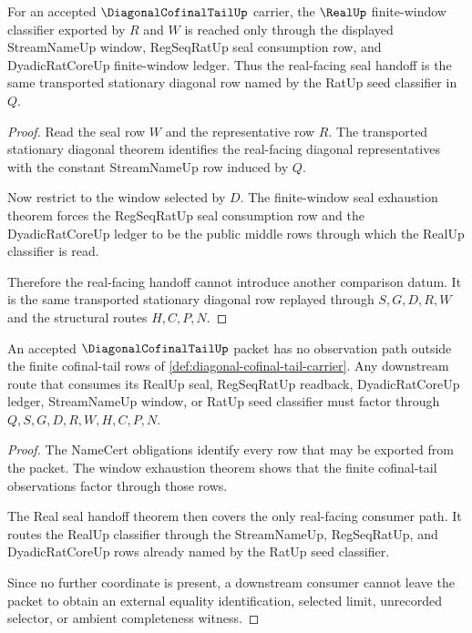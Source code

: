 \begin{theorem}
\label{thm:diagonal-cofinal-tail-real-seal-handoff}
For an accepted $\DiagonalCofinalTailUp$ carrier, the $\RealUp$ finite-window classifier exported by $R$ and $W$ is reached only through the displayed StreamNameUp window, RegSeqRatUp seal consumption row, and DyadicRatCoreUp finite-window ledger. Thus the real-facing seal handoff is the same transported stationary diagonal row named by the RatUp seed classifier in $Q$.
\end{theorem}
\begin{proof}
Read the seal row $W$ and the representative row $R$. The transported stationary diagonal theorem identifies the real-facing diagonal representatives with the constant StreamNameUp row induced by $Q$.

Now restrict to the window selected by $D$. The finite-window seal exhaustion theorem forces the RegSeqRatUp seal consumption row and the DyadicRatCoreUp ledger to be the public middle rows through which the RealUp classifier is read.

Therefore the real-facing handoff cannot introduce another comparison datum. It is the same transported stationary diagonal row replayed through $S,G,D,R,W$ and the structural routes $H,C,P,N$.
\end{proof}

\begin{theorem}
\label{thm:diagonal-cofinal-tail-nonescape}
An accepted $\DiagonalCofinalTailUp$ packet has no observation path outside the finite cofinal-tail rows of \autoref{def:diagonal-cofinal-tail-carrier}. Any downstream route that consumes its RealUp seal, RegSeqRatUp readback, DyadicRatCoreUp ledger, StreamNameUp window, or RatUp seed classifier must factor through $Q,S,G,D,R,W,H,C,P,N$.
\end{theorem}
\begin{proof}
The NameCert obligations identify every row that may be exported from the packet. The window exhaustion theorem shows that the finite cofinal-tail observations factor through those rows.

The Real seal handoff theorem then covers the only real-facing consumer path. It routes the RealUp classifier through the StreamNameUp, RegSeqRatUp, and DyadicRatCoreUp rows already named by the RatUp seed classifier.

Since no further coordinate is present, a downstream consumer cannot leave the packet to obtain an external equality identification, selected limit, unrecorded selector, or ambient completeness witness.
\end{proof}

